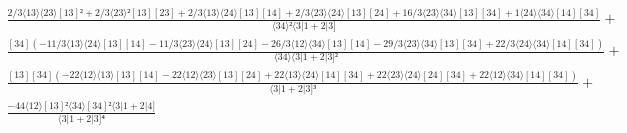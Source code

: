 \documentclass[varwidth, border=5pt]{standalone}
\begin{document}
\begin{my}
$\begin{gathered}
\scriptscriptstyle\frac{2/3⟨13⟩⟨23⟩[13]²+2/3⟨23⟩²[13][23]+2/3⟨13⟩⟨24⟩[13][14]+2/3⟨23⟩⟨24⟩[13][24]+16/3⟨23⟩⟨34⟩[13][34]+1⟨24⟩⟨34⟩[14][34]}{⟨34⟩²⟨3|1+2|3]} +\\
\scriptscriptstyle\frac{[34](-11/3⟨13⟩⟨24⟩[13][14]-11/3⟨23⟩⟨24⟩[13][24]-26/3⟨12⟩⟨34⟩[13][14]-29/3⟨23⟩⟨34⟩[13][34]+22/3⟨24⟩⟨34⟩[14][34])}{⟨34⟩⟨3|1+2|3]²} +\\
\scriptscriptstyle\frac{[13][34](-22⟨12⟩⟨13⟩[13][14]-22⟨12⟩⟨23⟩[13][24]+22⟨13⟩⟨24⟩[14][34]+22⟨23⟩⟨24⟩[24][34]+22⟨12⟩⟨34⟩[14][34])}{⟨3|1+2|3]³} +\\
\scriptscriptstyle\frac{-44⟨12⟩[13]²⟨34⟩[34]²⟨3|1+2|4]}{⟨3|1+2|3]⁴} \phantom{+}
\end{gathered}$
\end{my}
\end{document}
